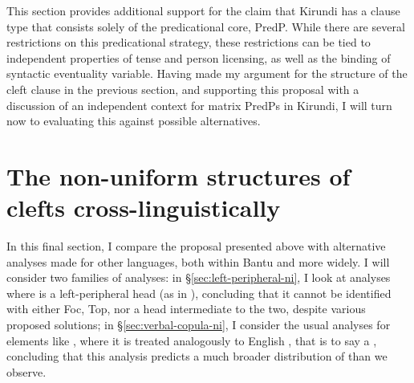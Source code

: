 \documentclass[12pt]{article}
\begin{document}
This section provides additional support for the claim that Kirundi has a clause type that consists solely of the predicational core, PredP. While there are several restrictions on this predicational strategy, these restrictions can be tied to independent properties of tense and person licensing, as well as the binding of syntactic eventuality variable. Having made my argument for the structure of the cleft clause in the previous section, and supporting this proposal with a discussion of an independent context for matrix PredPs in Kirundi, I will turn now to evaluating this against possible alternatives. 
%



\section{The non-uniform structures of clefts cross-linguistically} \label{sec:cleft-x-ling} 

In this final section, I compare the proposal presented above with alternative analyses made for other languages, both within Bantu and more widely. I will consider two families of analyses: in \S\ref{sec:left-peripheral-ni}, I look at analyses where  is a left-peripheral head (as in \citealt{rizzi-1997}), concluding that it cannot be identified with either Foc, Top, nor a head intermediate to the two, despite various proposed solutions; in \S\ref{sec:verbal-copula-ni}, I consider the usual analyses for elements like , where it is treated analogously to English , that is to say a , concluding that this analysis predicts a much broader distribution of  than we observe. 
\end{document}
